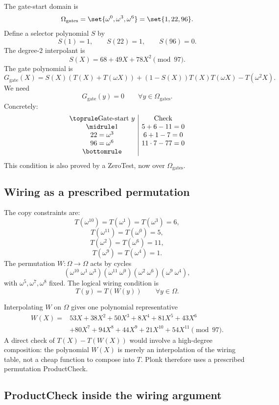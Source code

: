 The gate-start domain is
\[
    \Omega_{\mathrm{gates}}=\set{\omega^0,\omega^3,\omega^6}=\set{1,22,96}.
\]
Define a selector polynomial $S$ by
\[
    S(1)=1,
    \qquad
    S(22)=1,
    \qquad
    S(96)=0.
\]
The degree-$2$ interpolant is
\[
    S(X)=68+49X+78X^2\pmod{97}.
\]
The gate polynomial is
\[
    G_{\mathrm{gate}}(X)
    =S(X)(T(X)+T(\omega X))+(1-S(X))T(X)T(\omega X)-T(\omega^2X).
\]
We need
\[
    G_{\mathrm{gate}}(y)=0
    \qquad\forall y\in\Omega_{\mathrm{gates}}.
\]
Concretely:
\[
\begin{array}{c|c}
\toprule
\text{Gate-start }y & \text{Check}\\
\midrule
1 & 5+6-11=0\\
22=\omega^3 & 6+1-7=0\\
96=\omega^6 & 11\cdot7-77=0\\
\bottomrule
\end{array}
\]
This condition is also proved by a ZeroTest, now over $\Omega_{\mathrm{gates}}$.

\subsection{Wiring as a prescribed permutation}

The copy constraints are:
\[
T(\omega^{10})=T(\omega^1)=T(\omega^3)=6,
\]
\[
T(\omega^{11})=T(\omega^0)=5,
\]
\[
T(\omega^2)=T(\omega^6)=11,
\]
\[
T(\omega^9)=T(\omega^4)=1.
\]
The permutation $W:\Omega\to\Omega$ acts by cycles
\[
    (\omega^{10}\ \omega^1\ \omega^3)
    (\omega^{11}\ \omega^0)
    (\omega^2\ \omega^6)
    (\omega^9\ \omega^4),
\]
with $\omega^5,\omega^7,\omega^8$ fixed. The logical wiring condition is
\[
    T(y)=T(W(y))
    \qquad\forall y\in\Omega.
\]

Interpolating $W$ on $\Omega$ gives one polynomial representative
\[
\begin{aligned}
W(X)={}&53X+38X^2+50X^3+8X^4+81X^5+43X^6\\
&+80X^7+94X^8+44X^9+21X^{10}+54X^{11}
\pmod{97}.
\end{aligned}
\]
A direct check of $T(X)-T(W(X))$ would involve a high-degree composition: the polynomial $W(X)$ is merely an interpolation of the wiring table, not a cheap function to compose into $T$. Plonk therefore uses a prescribed permutation ProductCheck.

\subsection{ProductCheck inside the wiring argument}


